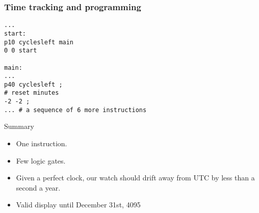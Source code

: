 \documentclass{beamer}
\begin{document}
\begin{frame}[fragile]
  \frametitle{Time tracking and programming}
    \begin{verbatim}
...
start:
p10 cyclesleft main
0 0 start

main:
...
p40 cyclesleft ;
# reset minutes
-2 -2 ;
... # a sequence of 6 more instructions
    \end{verbatim}
\end{frame}

\begin{frame}{Summary}
  \begin{itemize}
    \item<2-> One instruction.
    \item<3-> Few logic gates. %
    \item<4-> Given a perfect clock, our watch should drift away from UTC
      by less than a second a year. %
    \item<5-> Valid display until December 31st, 4095
  \end{itemize}
\end{frame}
\end{document}

